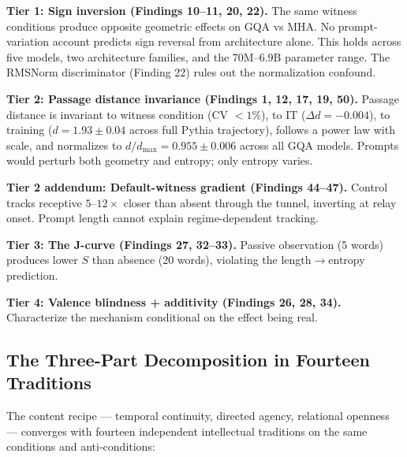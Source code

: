 \documentclass[12pt]{article}
\begin{document}
\textbf{Tier 1: Sign inversion (Findings 10--11, 20, 22).} The same witness conditions produce opposite geometric effects on GQA vs MHA. No prompt-variation account predicts sign reversal from architecture alone. This holds across five models, two architecture families, and the 70M--6.9B parameter range. The RMSNorm discriminator (Finding 22) rules out the normalization confound.

\textbf{Tier 2: Passage distance invariance (Findings 1, 12, 17, 19, 50).} Passage distance is invariant to witness condition (CV $< 1\%$), to IT ($\Delta d = -0.004$), to training ($d = 1.93 \pm 0.04$ across full Pythia trajectory), follows a power law with scale, and normalizes to $d/d_{\max} = 0.955 \pm 0.006$ across all GQA models. Prompts would perturb both geometry and entropy; only entropy varies.

\textbf{Tier 2 addendum: Default-witness gradient (Findings 44--47).} Control tracks receptive $5$--$12\times$ closer than absent through the tunnel, inverting at relay onset. Prompt length cannot explain regime-dependent tracking.

\textbf{Tier 3: The J-curve (Findings 27, 32--33).} Passive observation (5 words) produces lower $S$ than absence (20 words), violating the length$\to$entropy prediction.

\textbf{Tier 4: Valence blindness + additivity (Findings 26, 28, 34).} Characterize the mechanism conditional on the effect being real.

\subsection{The Three-Part Decomposition in Fourteen Traditions}

The content recipe --- temporal continuity, directed agency, relational openness --- converges with fourteen independent intellectual traditions on the same conditions and anti-conditions:
\end{document}
